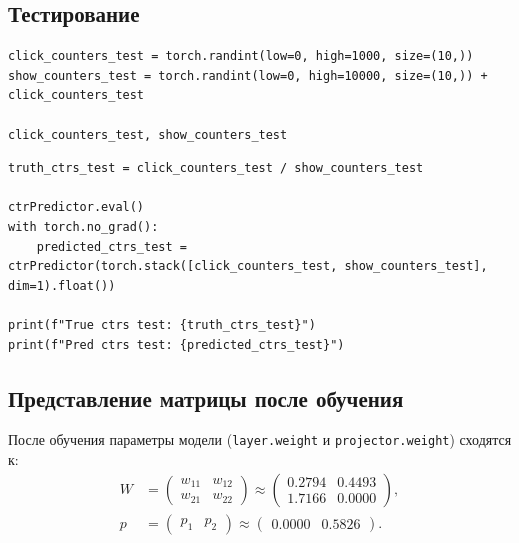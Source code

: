 \documentclass{report}
\begin{document}
\subsection{Тестирование}
\label{dcnddn:code:test}

\begin{lstlisting}[caption={Генерация тестовой выборки}]
click_counters_test = torch.randint(low=0, high=1000, size=(10,))
show_counters_test = torch.randint(low=0, high=10000, size=(10,)) + click_counters_test

click_counters_test, show_counters_test
\end{lstlisting}

\begin{lstlisting}[caption={Сравнение предсказаний с истинными CTR}]
truth_ctrs_test = click_counters_test / show_counters_test

ctrPredictor.eval()
with torch.no_grad():
    predicted_ctrs_test = ctrPredictor(torch.stack([click_counters_test, show_counters_test], dim=1).float())

print(f"True ctrs test: {truth_ctrs_test}")
print(f"Pred ctrs test: {predicted_ctrs_test}")
\end{lstlisting}

\subsection{Представление матрицы после обучения}
\label{dcnddn:code:weights}

\par После обучения параметры модели (\texttt{layer.weight} и \texttt{projector.weight}) сходятся к:
\begin{align}
    \label{dcnddn:code:weights:W}
    W &=
    \begin{pmatrix}
        w_{11} & w_{12}\\
        w_{21} & w_{22}
    \end{pmatrix}
    \approx
    \begin{pmatrix}
        0.2794 & 0.4493\\
        1.7166 & 0.0000
    \end{pmatrix},\\
    \label{dcnddn:code:weights:p}
    p &= \begin{pmatrix} p_1 & p_2 \end{pmatrix}
    \approx \begin{pmatrix} 0.0000 & 0.5826 \end{pmatrix}.
\end{align}
\end{document}
